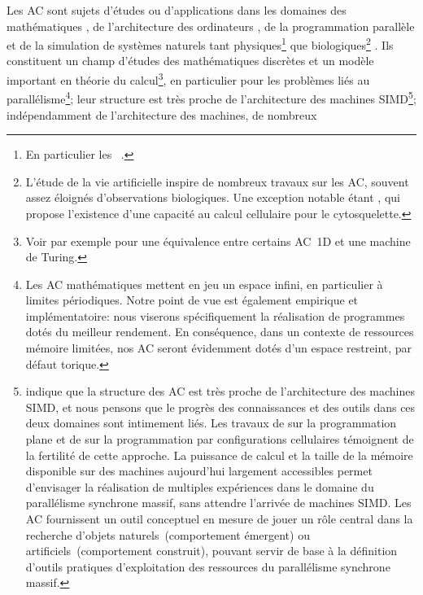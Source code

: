 Les AC sont sujets d'études ou d'applications dans les domaines des
mathématiques %
\cite[]{Jen90,Vichniac90}, %
de l'architecture des ordinateurs %
\cite[]{Legendi87a,Zsoter87}, %
de la programmation parallèle %
\cite[]{Preston84,Almasi87} %
et de la simulation de systèmes naturels %
tant physiques\footnote{%
  En particulier les ~\cite[]{Despain90,Margolus90}.} %
\cite[]{Margolus84,Toffoli84,Rossi93} %
que biologiques\footnote{%
  L'étude de la vie artificielle inspire de nombreux travaux sur les
  AC, souvent assez éloignés d'observations biologiques. %
  Une exception notable étant \cite{Hameroff89}, qui propose
  l'existence d'une capacité au calcul cellulaire pour le
  cytosquelette.} %
\cite[]{Tamayo89,Boer93}. %
Ils constituent un champ d'études des mathématiques discrètes et un
modèle important en théorie du calcul\footnote{%
  Voir par exemple \cite{Lindgren90} pour une équivalence
  entre certains AC~1D et une machine de Turing.}, %
en particulier pour les problèmes liés au parallélisme\footnote{%
  Les AC mathématiques mettent en jeu
  un espace infini, en particulier à limites périodiques. %
  Notre point de vue est également empirique et
  implémentatoire: nous viserons spécifiquement la réalisation de
  programmes dotés du meilleur rendement. %
  En conséquence, dans un contexte de ressources mémoire limitées, nos
  AC seront évidemment dotés d'un espace restreint, par défaut torique.}; %
leur structure est très proche de l'architecture des machines
SIMD\footnote{%
  \cite{Greussay85} indique que la structure des AC est très proche de
  l'architecture des machines SIMD, et nous pensons que le progrès des
  connaissances et des outils dans ces deux domaines sont intimement
  liés. %
  Les travaux de \cite{Rozin87,Rozin88,Rozin93} sur la programmation
  plane et de \cite{Signorini92,signorini94} sur la programmation par
  configurations cellulaires témoignent de la fertilité de cette
  approche. %
  La puissance de calcul et la taille de la mémoire disponible sur des
  machines aujourd'hui largement accessibles permet d'envisager la
  réalisation de multiples expériences dans le domaine du parallélisme
  synchrone massif, sans attendre l'arrivée de machines SIMD\@. %
  Les AC fournissent un outil conceptuel en mesure de jouer un rôle
  central dans la recherche d'objets naturels~(comportement émergent)
  ou artificiels~(comportement construit), pouvant servir de base à la
  définition d'outils pratiques d'exploitation des ressources du
  parallélisme synchrone massif.}; %
indépendamment de l'architecture des machines, de nombreux
